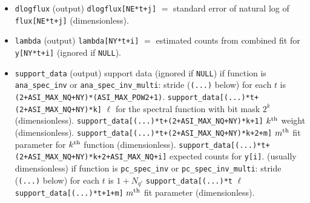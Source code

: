 \documentclass{article}    %
\begin{document}
\begin{itemize}
\item \verb|dlogflux| (output) \verb|dlogflux[NE*t+j]| $=$ standard error of natural log of \verb|flux[NE*t+j]| (dimensionless).
\item \verb|lambda| (output) \verb|lambda[NY*t+i]| $=$ estimated counts from combined fit for \verb|y[NY*t+i]| (ignored if \verb|NULL|).
\item \verb|support_data| (output) support data (ignored if \verb|NULL|)
\subitem if function is \verb|ana_spec_inv| or \verb|ana_spec_inv_multi|:
\subitem stride (\verb|(...)| below) for each $t$ is \verb|(2+ASI_MAX_NQ+NY)*(ASI_MAX_POW2+1)|. 
\subitem \verb|support_data[(...)*t+(2+ASI_MAX_NQ+NY)*k]| $\ell$ for the spectral function with bit mask $2^k$ (dimensionless).
\subitem \verb|support_data[(...)*t+(2+ASI_MAX_NQ+NY)*k+1]| $k^{\rm th}$ weight  (dimensionless).
\subitem \verb|support_data[(...)*t+(2+ASI_MAX_NQ+NY)*k+2+m]| $m^{\rm th}$ fit parameter for $k^{\rm th}$ function  (dimensionless).
\subitem \verb|support_data[(...)*t+(2+ASI_MAX_NQ+NY)*k+2+ASI_MAX_NQ+i]| expected counts for \verb|y[i]|. (usually dimensionless)
\subitem if function is \verb|pc_spec_inv| or \verb|pc_spec_inv_multi|:
\subitem stride (\verb|(...)| below) for each $t$ is $1+N_{q'}$
\subitem \verb|support_data[(...)*t| $\ell$ 
\subitem \verb|support_data[(...)*t+1+m]| $m^{\rm th}$ fit parameter (dimensionless).
\end{itemize}
\end{document}
